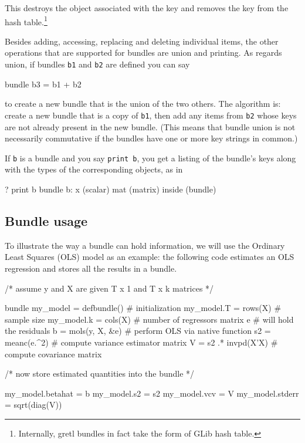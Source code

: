 This destroys the object associated with the key and removes the key
from the hash table.\footnote{Internally, gretl bundles in fact take
  the form of \textsf{GLib} hash table.}

Besides adding, accessing, replacing and deleting individual items,
the other operations that are supported for bundles are union and
printing. As regards union, if bundles \texttt{b1} and \texttt{b2} are
defined you can say

\begin{code}
bundle b3 = b1 + b2
\end{code}

to create a new bundle that is the union of the two others. The
algorithm is: create a new bundle that is a copy of \texttt{b1}, then
add any items from \texttt{b2} whose keys are not already present in
the new bundle. (This means that bundle union is not necessarily
commutative if the bundles have one or more key strings in common.)

If \texttt{b} is a bundle and you say \texttt{print b}, you get a
listing of the bundle's keys along with the types of the corresponding
objects, as in

\begin{code}
? print b
bundle b:
 x (scalar)
 mat (matrix)
 inside (bundle)
\end{code}

\subsection{Bundle usage}
\label{sec:bundle-usage}

To illustrate the way a bundle can hold information, we will use the
Ordinary Least Squares (OLS) model as an example: the following code
estimates an OLS regression and stores all the results in a bundle.

\begin{code}
/* assume y and X are given T x 1 and T x k matrices */

bundle my_model = defbundle()        # initialization
my_model.T = rows(X)                 # sample size
my_model.k = cols(X)                 # number of regressors
matrix e                             # will hold the residuals
b = mols(y, X, &e)                   # perform OLS via native function
s2 = meanc(e.^2)                     # compute variance estimator
matrix V = s2 .* invpd(X'X)          # compute covariance matrix

/* now store estimated quantities into the bundle */

my_model.betahat = b
my_model.s2 = s2
my_model.vcv = V
my_model.stderr = sqrt(diag(V))
\end{code}

